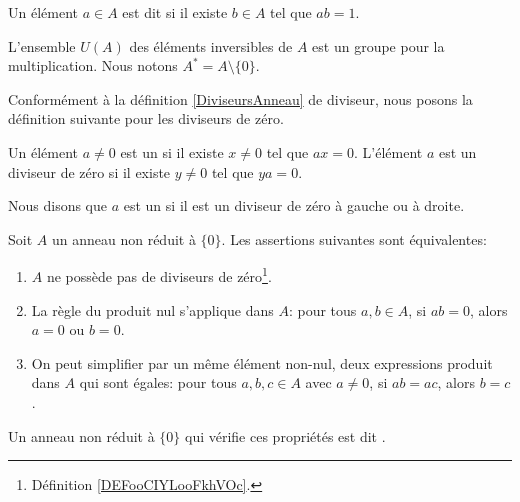 \begin{definition}        \label{DEFooCIHVooAhpJxy}
	Un élément \( a \in A \) est dit  si il existe \( b \in A \) tel que \( ab = 1 \).

	L'ensemble \( U(A)\) des éléments inversibles de \( A\) est un groupe pour la multiplication. Nous notons \( A^*=A\setminus\{ 0 \}\).
\end{definition}

Conformément à la définition \ref{DiviseursAnneau} de diviseur, nous posons la définition suivante pour les diviseurs de zéro.
\begin{definition}		\label{DEFooCIYLooFkhVOc}
	Un élément \( a\neq 0\) est un  si il existe \( x\neq 0\) tel que \( ax=0\). L'élément \( a\) est un diviseur de zéro  si il existe \( y\neq 0\) tel que \( ya=0\).

	Nous disons que \( a\) est un  si il est un diviseur de zéro à gauche ou à droite.
\end{definition}

\begin{propositionDef}           \label{DEFooTAOPooWDPYmd}
	Soit \( A\) un anneau non réduit à \( \{ 0 \}\). Les assertions suivantes sont équivalentes:
	\begin{enumerate}
		\item       \label{ITEMooMXMKooXMYpkN}
		      \( A\) ne possède pas de diviseurs de zéro\footnote{Définition \ref{DEFooCIYLooFkhVOc}.}.
		\item       \label{ITEMooLAJCooFwxXrV}
		      La règle du produit nul s'applique dans \( A\): pour tous \( a, b \in A \), si \( ab=0\), alors \( a = 0\) ou \( b = 0\).
		\item       \label{ITEMooQNTFooSRrVPK}
		      On peut simplifier par un même élément non-nul, deux expressions produit dans \( A\) qui sont égales: pour tous \( a, b, c \in A \) avec \( a \neq 0 \), si \( ab = ac \), alors \( b = c \).
	\end{enumerate}
	Un anneau non réduit à \( \{ 0 \}\) qui vérifie ces propriétés est dit .
\end{propositionDef}

